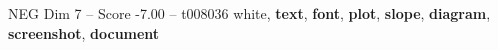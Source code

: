 \begin{textsample}{NEG Dim 7 – Score -7.00 – t008036}  \label{ex:f7_neg_039}
white, \textbf{text}, \textbf{font}, \textbf{plot}, \textbf{slope}, \textbf{diagram}, \textbf{screenshot}, \textbf{document}

\end{textsample}

